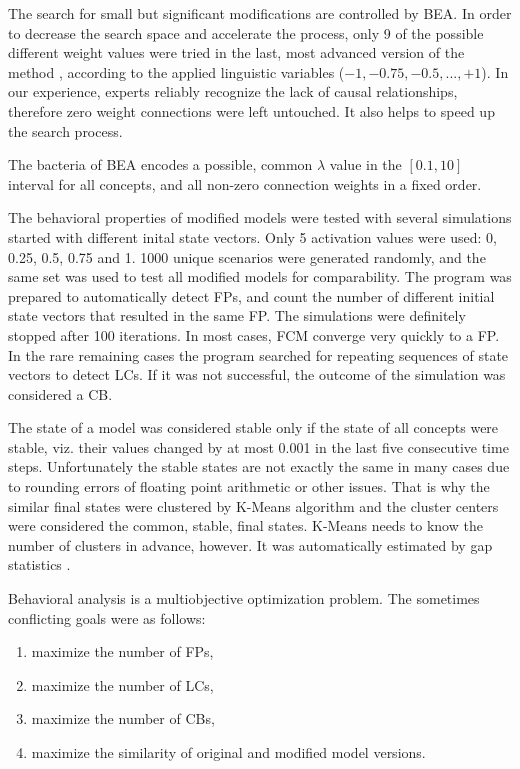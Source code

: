 \documentclass[graybox]{svmult}
\begin{document}
The search for small but significant modifications are controlled by 
BEA. In order to decrease the search space and accelerate the 
process, only 9 of the possible different weight values were tried 
in the last, most advanced version of the method \cite
{hatwagner2018improved}, according to the applied linguistic 
variables ($-1, -0.75, -0.5, ..., +1$). In our experience, experts 
reliably recognize the lack of causal relationships, therefore zero 
weight connections were left untouched. It also helps to speed up the 
search process.

The bacteria of BEA encodes a possible, common $\lambda$ value in the 
$[0.1, 10]$ interval for all concepts, and all non-zero connection 
weights in a fixed order.

The behavioral properties of modified models were tested with several 
simulations started with different inital state vectors. Only 5 
activation values were used: 0, 0.25, 0.5, 0.75 and 1. 1000 unique 
scenarios were generated randomly, and the same set was used to test 
all modified models for comparability. The program was prepared to 
automatically detect FPs, and count the number of different 
initial state vectors that resulted in the same FP. The simulations 
were definitely stopped after 100 iterations. In most cases, FCM 
converge very quickly to a FP. In the rare remaining cases the program 
searched for repeating sequences of state vectors to detect LCs. If it 
was not successful, the outcome of the simulation was considered a CB. 

The state of a model was considered stable only if the state of all 
concepts were stable, viz. their values changed by at most 0.001 in 
the last five consecutive time steps. Unfortunately the stable 
states are not exactly the same in many cases due to rounding errors 
of floating point arithmetic or other issues. That is why the 
similar final states were clustered by K-Means algorithm \cite
{hartigan1979algorithm} and the cluster centers were considered the 
common, stable, final states. K-Means needs to know the number of 
clusters in advance, however. It was automatically estimated by gap 
statistics \cite{tibshirani2001estimating}.

Behavioral analysis is a multiobjective optimization problem. The 
sometimes conflicting goals were as follows:
\begin{enumerate}
  \item maximize the number of FPs,
  \item maximize the number of LCs,
  \item maximize the number of CBs,
  \item maximize the similarity of original and modified model 
  versions.
\end{enumerate}
\end{document}
